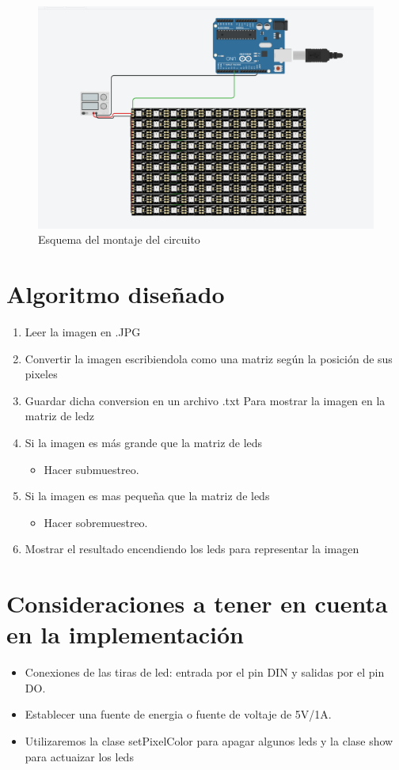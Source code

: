 \documentclass{article}
\begin{document}
\begin{figure}[ht]
\includegraphics[width=12cm]{Esquema.PNG}
\centering
\caption{Esquema del montaje del circuito}
\label{fig:Montaje}
\end{figure}

\section{Algoritmo diseñado} 

\begin{enumerate}
    \item Leer la imagen en .JPG
    \item Convertir la imagen escribiendola como una matriz según la posición de sus pixeles
    \item Guardar dicha conversion en un archivo .txt
Para mostrar la imagen en la matriz de ledz
    \item Si la imagen es más grande que la matriz de leds
        \begin{itemize}
            \item Hacer submuestreo.
        \end{itemize}
    \item Si la imagen es mas pequeña que la matriz de leds
        \begin{itemize}
            \item Hacer sobremuestreo.
        \end{itemize}
    \item Mostrar el resultado encendiendo los leds para representar la imagen
\end{enumerate}

\section{Consideraciones a tener en cuenta en la implementación}
\begin{itemize}
\item Conexiones de las tiras de led: entrada por el pin DIN y salidas por el pin DO.
\item Establecer una fuente de energia o  fuente de voltaje de 5V/1A.
\item Utilizaremos la clase setPixelColor para apagar algunos leds y la clase show para actuaizar los leds

\end{itemize}
\end{document}
